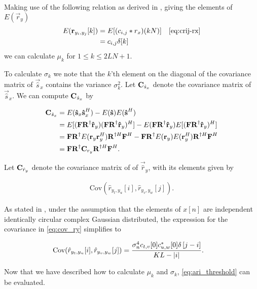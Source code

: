 \documentclass[a4paper, openany, oneside]{memoir}
\begin{document}
Making use of the following relation as derived in \cite{ariananda2012compressive}, giving  the elements of $E(\vec{r}_y)$ 
\begin{align*}
E(\vec{r}_{y_i, y_j}[k]) &= E[(c_{i,j} \ast r_x) (kN)] & \text{\cref{eq:crij-rx}} \\
&= c_{i,j} \delta[k]
\end{align*}
we can calculate $\mu_k$ for $1 \leq k \leq 2LN+1$.

To calculate $\sigma_k$ we note that the $k$'th element on the diagonal of the covariance matrix of $\vec{\hat{s}}_x$ contains the variance $\sigma_k^2$. Let $\boldsymbol{\mathbf{C}}_{\hat{s}_x}$ denote the covariance matrix of $\vec{\hat{s}}_x$.  We can compute $\boldsymbol{\mathbf{C}}_{\hat{s}_x}$ by

\begin{align}\label{eq:terror_cov_sx}
\boldsymbol{\mathbf{C}}_{\hat{s}_x} &= E(\boldsymbol{\mathbf{\hat{s}}}_x\boldsymbol{\mathbf{\hat{s}}}_x^H) - E(\boldsymbol{\mathbf{\hat{s}}})E(\boldsymbol{\mathbf{\hat{s}}}^H) \\
&= E[(\boldsymbol{\mathbf{F}} \boldsymbol{\mathbf{R}}^{\dagger}\boldsymbol{\mathbf{\hat{r}}}_y) ( \boldsymbol{\mathbf{F}}\boldsymbol{\mathbf{R}}^{\dagger}\boldsymbol{\mathbf{\hat{r}}}_y)^H] - E(\boldsymbol{\mathbf{F}}\boldsymbol{\mathbf{R}}^{\dagger}\boldsymbol{\mathbf{\hat{r}}}_y)E[(\boldsymbol{\mathbf{F}}\boldsymbol{\mathbf{R}}^{\dagger}\boldsymbol{\mathbf{\hat{r}}}_y)^H] \nonumber \\
&= \boldsymbol{\mathbf{F}}\boldsymbol{\mathbf{R}}^{\dagger} E(\boldsymbol{\mathbf{r}}_y\boldsymbol{\mathbf{r}}_y^H)  \boldsymbol{\mathbf{R}}^{\dagger H}\boldsymbol{\mathbf{F}}^H -  \boldsymbol{\mathbf{F}}\boldsymbol{\mathbf{R}}^{\dagger} E( \boldsymbol{\mathbf{r}}_y) E(\boldsymbol{\mathbf{r}}_y^H)  \boldsymbol{\mathbf{R}}^{\dagger H}\boldsymbol{\mathbf{F}}^H \nonumber \\
&= \boldsymbol{\mathbf{F}}\boldsymbol{\mathbf{R}}^{\dagger} \boldsymbol{\mathbf{C}}_{r_y} \boldsymbol{\mathbf{R}}^{\dagger H}\boldsymbol{\mathbf{F}}^H.\nonumber
\end{align}

Let $\boldsymbol{\mathbf{C}}_{\hat{r}_y}$ denote the covariance matrix of of $\vec{\hat{r}}_y$, with its elements given by

\begin{align}\label{eq:cov_ry}
\text{Cov}(\hat{r}_{y_t,y_u}[i],\hat{r}_{y_v, y_w}[j]).
\end{align}

As stated in \cite{ariananda2012compressive}, under the assumption that the elements of $x[n]$ are independent identically circular complex Gaussian distributed, the expression for the covariance in \cref{eq:cov_ry} simplifies to

\begin{align}\label{eq:elem_cov_ry}
\text{Cov}(\hat{r}_{y_t,y_u}[i],\hat{r}_{y_v, y_w}[j]) &= \frac{\sigma_n^4 c_{t,v}[0] c^*_{u,w}[0] \delta \left[ j-i\right]}{KL-|i|}.
\end{align}

Now that we have described how to calculate $\mu_k$ and $\sigma_k$, \cref{eq:ari_threshold} can be evaluated.
\end{document}
